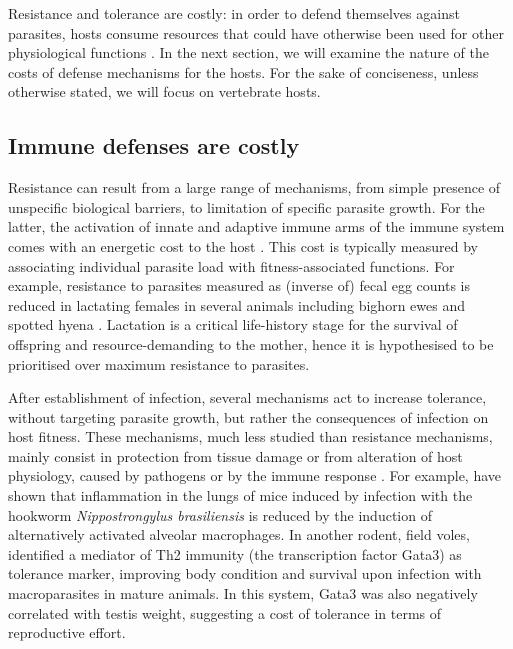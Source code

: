 \par
Resistance and tolerance are costly: in order to defend themselves against parasites, hosts consume resources that could have otherwise been used for other physiological functions \citep{sheldon_ecological_1996}. In the next section, we will examine the nature of the costs of defense mechanisms for the hosts. For the sake of conciseness, unless otherwise stated, we will focus on vertebrate hosts.

\subsection{Immune defenses are costly}
Resistance can result from a large range of mechanisms, from simple presence of unspecific biological barriers, to limitation of specific parasite growth. For the latter, the activation of innate and adaptive immune arms of the immune system comes with an energetic cost to the host \citep{schmid-hempel_evolutionary_2013}. This cost is typically measured by associating individual parasite load with fitness-associated functions. For example, resistance to parasites measured as (inverse of) fecal egg counts is reduced in lactating females in several animals including bighorn ewes \citep{festa-bianchet_individual_1989} and spotted hyena \citep{east_does_2015}. Lactation is a critical life-history stage for the survival of offspring and resource-demanding to the mother, hence it is hypothesised to be prioritised over maximum resistance to parasites.
\par
After establishment of infection, several mechanisms act to increase tolerance, without targeting parasite growth, but rather the consequences of infection on host fitness. These mechanisms, much less studied than resistance mechanisms, mainly consist in protection from tissue damage or from alteration of host physiology, caused by pathogens or by the immune response \citep{medzhitov_disease_2012}. For example, \cite{reece_innate_2006} have shown that inflammation in the lungs of mice induced by infection with the hookworm \textit{Nippostrongylus brasiliensis} is reduced by the induction of alternatively activated alveolar macrophages. In another rodent, field voles, \cite{jackson_immunological_2014} identified a mediator of Th2 immunity (the transcription factor Gata3) as tolerance marker, improving body condition and survival upon infection with macroparasites in mature animals. In this system, Gata3 was also negatively correlated with testis weight, suggesting a cost of tolerance in terms of reproductive effort.
